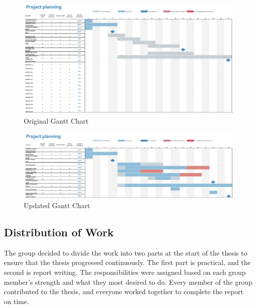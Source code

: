 \vspace{2mm}
\begin{figure}[H]
    \centering
    \includegraphics[width=1\columnwidth]{Images/gantt2.jpg}
    \caption{Original Gantt Chart}
    \label{fig: Original Gantt Chart}
\end{figure}

\vspace{2mm}
\begin{figure}[H]
    \centering
    \includegraphics[width=1\columnwidth]{Images/finished-gantt.png}
    \caption{Updated Gantt Chart}
    \label{fig: Updated Gantt Chart}
\end{figure}


\subsection{Distribution of Work}
The group decided to divide the work into two parts at the start of the thesis to ensure that the thesis progressed continuously. The first part is practical, and the second is report writing. The responsibilities were assigned based on each group member's strength and what they most desired to do. Every member of the group contributed to the thesis, and everyone worked together to complete the report on time. 


